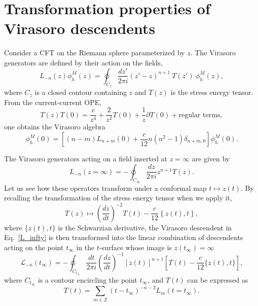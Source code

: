 \documentclass[a4paper,11pt]{article}
\begin{document}
\appendix
\section{Transformation properties of Virasoro descendents}\label{app_ward}

Consider a CFT on the Riemann sphere parameterized by $z$. The Virasoro 
generators are defined by their action on the fields,
\begin{equation}
\label{vir_ln}
 L_{-n}(z)\phi^{M}_h(z)=\oint_{C_{z}}\frac{dz'}{2\pi i}(z'-z)^{n+1}~T(z')~\phi^{M}_h(z),
\end{equation}
where $C_{z}$ is a closed contour containing $z$ and $T(z)$ is the stress energy tensor. 
From the current-current OPE,
\begin{equation}
T(z) T(0)= \frac{c}{z^4}+ \frac{2}{z^2} T(0)+\frac{1}{z}\partial T (0)+\text{regular terms},
\end{equation} 
one obtains the  Virasoro algebra
\begin{equation}
 [L_n(0), L_{m}(0)]\phi^{M}_h(0) =\left[(n-m) L_{n+m}(0)+\frac{c}{12}n(n^2-1)\delta_{n+m, 0}\right]\phi^{M}_h(0).
\end{equation}

The Virasoro generators acting on a field inserted at $z=\infty$ are given by
\begin{equation}\label{L_infty}
 L_{-n}(z=\infty)=-\oint_{C_{\infty}}\frac{dz}{2\pi i}z^{n+1}T(z).
\end{equation}
Let us see how these operators transform under a conformal map
$t \mapsto z(t)$. By recalling the transformation of the stress energy tensor 
when we apply it,
\begin{equation}
T(z)\mapsto \left(\frac{d z}{d t}\right)^{-2} T(t)-\frac{c}{12}\left\{z(t),t\right\},
\end{equation}
where $\{z(t),t\}$ is the Schwarzian derivative, the Virasoro descendent in Eq.~\eqref{L_infty}
is then transformed into the linear combination of descendents acting on the point
$t_\infty$ in the $t$-surface whose image is $z(t_\infty)=\infty$
\begin{equation}\label{Virasoro_transf}
 \mathcal{L}_{-n}(t_\infty)=-\oint_{C_{t_\infty}}\frac{dt}{2\pi i}
 \left(\frac{dz}{dt}\right)^{-1}[z(t)]^{n+1}\left[T(t)-\frac{c}{12}\{z(t), t\}\right],
\end{equation}
where $C_{t_\infty}$ is a contour encircling the point $t_\infty$, and $T(t)$ can be 
expressed as
\begin{equation}
 T(t)=\sum_{m\in\mathbb{Z}}(t-t_\infty)^{-n-2}L_m(t=t_\infty).
\end{equation}
\end{document}
